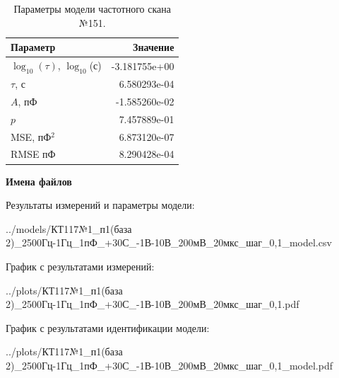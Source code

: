 \begin{table}[!ht]
    \centering
    \caption{Параметры модели частотного скана №151.}
    \begin{tabular}{|l|r|}
        \hline
        Параметр                                       & Значение                  \\ \hline
        $\log_{10}(\tau)$, $\log_{10}$(с)              & -3.181755e+00             \\ \hline
        $\tau$, с                                      & 6.580293e-04              \\ \hline
        $A$, пФ                                        & -1.585260e-02             \\ \hline
        $p$                                            & 7.457889e-01              \\ \hline
        MSE, пФ$^2$                                    & 6.873120e-07              \\ \hline
        RMSE пФ                                        & 8.290428e-04              \\ \hline
    \end{tabular}
    \label{table:frequency_scan_model_151}
\end{table}

\textbf{Имена файлов}

Результаты измерений и параметры модели:

\scriptsize../models/КТ117№1\_п1(база 2)\_2500Гц-1Гц\_1пФ\_+30С\_-1В-10В\_200мВ\_20мкс\_шаг\_0,1\_model.csv
\normalsize

График с результатами измерений:

\scriptsize../plots/КТ117№1\_п1(база 2)\_2500Гц-1Гц\_1пФ\_+30С\_-1В-10В\_200мВ\_20мкс\_шаг\_0,1.pdf
\normalsize

График с результатами идентификации модели:

\scriptsize../plots/КТ117№1\_п1(база 2)\_2500Гц-1Гц\_1пФ\_+30С\_-1В-10В\_200мВ\_20мкс\_шаг\_0,1\_model.pdf
\normalsize

